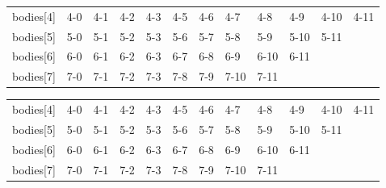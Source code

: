 \documentclass[a4paper]{article}
\begin{document}
\enspace

\begin{minipage}[b]{.40\textwidth}
  \centering
  \begin{tabular}{llllllllllll}
bodies{[}4{]} & 4-0 & 4-1 & 4-2 & 4-3 & 4-5 & 4-6 & 4-7  & 4-8  & 4-9  & 4-10 & 4-11 \\
bodies{[}5{]} & 5-0 & 5-1 & 5-2 & 5-3 & 5-6 & 5-7 & 5-8  & 5-9  & 5-10 & 5-11 &      \\
bodies{[}6{]} & 6-0 & 6-1 & 6-2 & 6-3 & 6-7 & 6-8 & 6-9  & 6-10 & 6-11 &      &      \\
bodies{[}7{]} & 7-0 & 7-1 & 7-2 & 7-3 & 7-8 & 7-9 & 7-10 & 7-11 &      &      &     
\end{tabular}
  \label{tab:t_app3}
\end{minipage} \qquad
\begin{minipage}[b]{.40\textwidth}
  \centering
\begin{tabular}{llllllllllll}
bodies{[}4{]} & 4-0 & 4-1 & 4-2 & 4-3 & 4-5 & 4-6 & 4-7  & 4-8  & 4-9  & 4-10 & 4-11 \\
bodies{[}5{]} & 5-0 & 5-1 & 5-2 & 5-3 & 5-6 & 5-7 & 5-8  & 5-9  & 5-10 & 5-11 &      \\
bodies{[}6{]} & 6-0 & 6-1 & 6-2 & 6-3 & 6-7 & 6-8 & 6-9  & 6-10 & 6-11 &      &      \\
bodies{[}7{]} & 7-0 & 7-1 & 7-2 & 7-3 & 7-8 & 7-9 & 7-10 & 7-11 &      &      &     
\end{tabular}
  \label{tab:t_app4}
\end{minipage}
\end{document}
